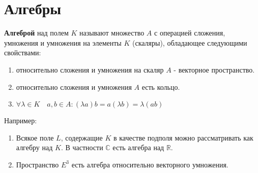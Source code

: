 \section{Алгебры}
\textbf{Алгеброй} над полем $K$ называют множество $A$ с операцией сложения, умножения и умножения на элементы $K$ (скаляры), обладающее следующими свойствами:
\begin{enumerate}
	\item относительно сложения и умножения на скаляр $A$ - векторное пространство.
	\item относительно сложения и умножения $A$ есть кольцо.
	\item $\forall \lambda \in K \quad a, b \in A : (\lambda a) b = a (\lambda b) = \lambda (ab)$ 
\end{enumerate}

 Например:
 \begin{enumerate}
 	\item Всякое поле $L$, содержащие $K$ в качестве подполя можно рассматривать как алгебру над $K$. В частности $\mathbb{C}$ есть алгебра над $\mathbb{R}$.
 	\item Пространство $E^3$ есть алгебра относительно векторного умножения.
 \end{enumerate}